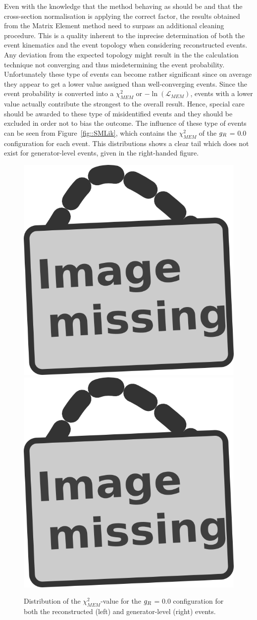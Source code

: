 Even with the knowledge that the method behaving as should be and that the cross-section normalisation is applying the correct factor, the results obtained from the Matrix Element method need to surpass an additional cleaning procedure. This is a quality inherent to the inprecise determination of both the event kinematics and the event topology when considering reconstructed events. Any deviation from the expected topology might result in the the calculation technique not converging and thus misdetermining the event probability.
\\
Unfortunately these type of events can become rather significant since on average they appear to get a lower value assigned than well-converging events. Since the event probability is converted into a $\chi^{2}_{MEM}$ or $-\ln(\mathcal{L}_{MEM})$, events with a lower value actually contribute the strongest to the overall result. Hence, special care should be awarded to these type of misidentified events and they should be excluded in order not to bias the outcome.
The influence of these type of events can be seen from Figure~\ref{fig::SMLik}, which contains the $\chi^{2}_{MEM}$ of the $g_{R}$ = $0.0$ configuration for each event. This distributions shows a clear tail which does not exist for generator-level events, given in the right-handed figure.
\begin{figure}[h!t]
 \centering
 \includegraphics[width = 0.35 \textwidth]{image.png}
 \includegraphics[width = 0.35 \textwidth]{image.png}
 \caption{Distribution of the $\chi^{2}_{MEM}$-value for the $g_{R}$ = $0.0$ configuration for both the reconstructed (left) and generator-level (right) events.} \label{Fig::SMLik}
\end{figure}

